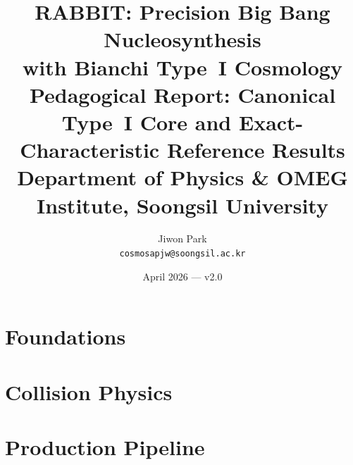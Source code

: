 \documentclass[12pt,a4paper]{article}
\title{\vspace{-1cm}\textbf{RABBIT: Precision Big Bang Nucleosynthesis\\
with Bianchi Type~I Cosmology}\\[10pt]
\large Pedagogical Report: Canonical Type~I Core and Exact-Characteristic Reference Results\\[6pt]
\normalsize Department of Physics \& OMEG Institute, Soongsil University}
\author{Jiwon Park\\\small\texttt{cosmosapjw@soongsil.ac.kr}}
\date{April 2026 --- v2.0}
\begin{document}



\part{Foundations}













\part{Collision Physics}











\part{Production Pipeline}





















\begin{appendices}











\end{appendices}

\end{document}
